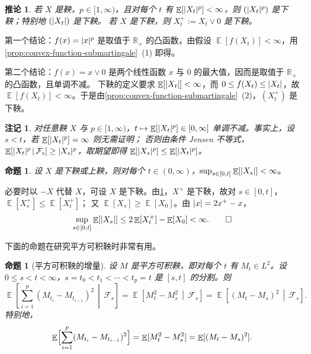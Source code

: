 \documentclass[UTF8,11pt,a4paper,oneside,fontset=fandol]{ctexrep}
\makeatletter
\numberwithin{equation}{section}
\theoremstyle{zhthm}
\newtheorem{proposition}[theorem]{命题}
\newtheorem{corollary}[theorem]{推论}
\newtheorem{remark}[theorem]{注记}
\renewenvironment{proof}[1][\proofname]{\par
  \pushQED{\qed}%
  \normalfont\topsep6\p@\@plus6\p@\relax
  \trivlist
  \item[\hskip\labelsep\bfseries#1\hspace{0.5em}]\ignorespaces
}{%
  \popQED\endtrivlist\@endpefalse
}
\renewcommand{\proofname}{证明}
\newcommand{\R}{\mathbb{R}}
\newcommand{\F}{\mathcal{F}}
\DeclareMathOperator{\E}{\mathbb{E}}
\newcommand{\Econd}[2]{%
  \E\!\left[#1\,\middle|\,#2\right]}
\DeclarePairedDelimiter{\abs}{\lvert}{\rvert}
\makeatother
\begin{document}
\begin{corollary}
\label{cor:martingale-abs-power}
若 $X$ 是鞅，$p\in[1,\infty)$，且对每个 $t$ 有 $\E[\abs{X_t}^p]<\infty$，则 $(\abs{X_t}^p)$ 是下鞅；特别地 $(\abs{X_t})$ 是下鞅。
若 $X$ 是下鞅，则 $X^+_t:=X_t\vee0$ 是下鞅。
\end{corollary}

\begin{proof}
第一个结论：$f(x)=\abs x^p$ 是取值于 $\R_+$ 的凸函数，由假设 $\E[f(X_t)]<\infty$，用\cref{prop:convex-function-submartingale}~(1) 即得。

第二个结论：$f(x)=x\vee0$ 是两个线性函数 $x$ 与 $0$ 的最大值，因而是取值于 $\R_+$ 的凸函数，且单调不减。
下鞅的定义要求 $\E[\abs{X_t}]<\infty$，而 $0\le f(X_t)\le\abs{X_t}$，故 $\E[f(X_t)]<\infty$。于是由\cref{prop:convex-function-submartingale}~(2)，$(X^+_t)$ 是下鞅。
\end{proof}

\begin{remark}
\label{rem:martingale-lp-norm-monotone}
对任意鞅 $X$ 与 $p\in[1,\infty)$，$t\mapsto\E[\abs{X_t}^p]\in[0,\infty]$ 单调不减。事实上，设 $s<t$，若 $\E[\abs{X_t}^p]=\infty$ 则无需证明；
否则由条件 Jensen 不等式，$\Econd{\abs{X_t}^p}{\F_s}\ge\abs{X_s}^p$，取期望即得 $\E[\abs{X_s}^p]\le\E[\abs{X_t}^p]$。
\end{remark}

\begin{proposition}
\label{prop:submartingale-l1-bounded}
设 $X$ 是下鞅或上鞅，则对每个 $t\in(0,\infty)$，$\sup_{s\in[0,t]}\E[\abs{X_s}]<\infty$。
\end{proposition}

\begin{proof}
必要时以 $-X$ 代替 $X$，可设 $X$ 是下鞅。由\cref{cor:martingale-abs-power}，$X^+$ 是下鞅，故对 $s\in[0,t]$，$\E[X_s^+]\le\E[X_t^+]$；
又 $\E[X_s]\ge\E[X_0]$。由 $\abs x=2x^+-x$，
\[
  \sup_{s\in[0,t]}\E[\abs{X_s}]\le2\E[X_t^+]-\E[X_0]<\infty.\qedhere
\]
\end{proof}

下面的命题在研究平方可积鞅时非常有用。

\begin{proposition}[平方可积鞅的增量]
\label{prop:square-integrable-martingale-increments}
设 $M$ 是平方可积鞅，即对每个 $t$ 有 $M_t\in L^2$。设 $0\le s<t<\infty$，$s=t_0<t_1<\cdots<t_p=t$ 是 $[s,t]$ 的分割。则
\[
  \Econd{\sum_{i=1}^{p}(M_{t_i}-M_{t_{i-1}})^2}{\F_s}=\Econd{M_t^2-M_s^2}{\F_s}=\Econd{(M_t-M_s)^2}{\F_s}.
\]
特别地，
\[
  \E\Bigl[\sum_{i=1}^{p}(M_{t_i}-M_{t_{i-1}})^2\Bigr]=\E[M_t^2-M_s^2]=\E[(M_t-M_s)^2].
\]
\end{proposition}
\end{document}
